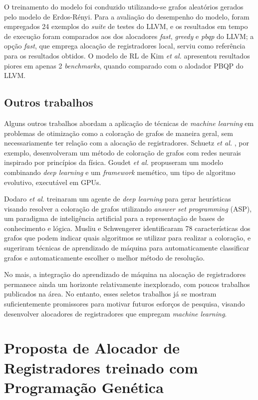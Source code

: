 \documentclass[
	12pt,				%
	openright,			%
	twoside,			%
	a4paper,			%
	tcc,			%
	]{ABNT-DC-UEL}
\begin{document}
O treinamento do modelo foi conduzido utilizando-se grafos aleatórios gerados pelo modelo de Erdos-Rényi. Para a avaliação do desempenho do modelo, foram empregados 24 exemplos do \textit{suite} de testes do LLVM, e os resultados em tempo de execução foram comparados aos dos alocadores \textit{fast}, \textit{greedy} e \textit{pbqp} do LLVM; a opção \textit{fast}, que emprega alocação de registradores local, serviu como referência para os resultados obtidos. O modelo de RL de Kim \textit{et al.} apresentou resultados piores em apenas 2 \textit{benchmarks}, quando comparado com o alodador PBQP do LLVM.

\section{Outros trabalhos}

Alguns outros trabalhos abordam a aplicação de técnicas de \textit{machine learning} em problemas de otimização como a coloração de grafos de maneira geral, sem necessariamente ter relação com a alocação de registradores. Schuetz \textit{et al.} \cite{schuetz:22}, por exemplo, desenvolveram um método de coloração de grafos com redes neurais inspirado por princípios da física. Goudet \textit{et al.} \cite{goudet:22} propuseram um modelo combinando \textit{deep learning} e um \textit{framework} memético, um tipo de algoritmo evolutivo, executável em GPUs. 

Dodaro \textit{et al.} \cite{dodaro:22} treinaram um agente de \textit{deep learning} para gerar heurísticas visando resolver a coloração de grafos utilizando \textit{answer set programming} (ASP), um paradigma de inteligência artificial para a representação de bases de conhecimento e lógica. Musliu e Schwengerer \cite{musliu:13} identificaram 78 características dos grafos que podem indicar quais algoritmos se utilizar para realizar a coloração, e sugeriram técnicas de aprendizado de máquina para automaticamente classificar grafos e automaticamente escolher o melhor método de resolução.

No mais, a integração do aprendizado de máquina na alocação de registradores permanece ainda um horizonte relativamente inexplorado, com poucos trabalhos publicados na área. No entanto, esses seletos trabalhos já se mostram suficientemente promissores para motivar futuros esforços de pesquisa, visando desenvolver alocadores de registradores que empregam \textit{machine learning}.

\chapter{Proposta de Alocador de Registradores treinado com Programação Genética}
\end{document}
